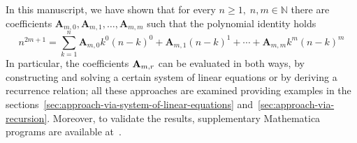 In this manuscript, we have shown that for every $n\geq 1, \; n,m\in\mathbb{N}$
there are coefficients $\mathbf{A}_{m,0}, \mathbf{A}_{m,1}, \ldots, \mathbf{A}_{m,m}$ such that
the polynomial identity holds
\[
    n^{2m+1} = \sum_{k=1}^{n} \mathbf{A}_{m,0} k^0 (n-k)^0 + \mathbf{A}_{m,1}(n-k)^1
    + \cdots + \mathbf{A}_{m,m} k^m (n-k)^m
\]
In particular, the coefficients ${\mathbf{A}} \sb{m,r}$ can be evaluated in both ways,
by constructing and solving a certain system of linear equations or by deriving a recurrence relation;
all these approaches are examined providing examples
in the sections~\ref{sec:approach-via-system-of-linear-equations} and~\ref{sec:approach-via-recursion}.
Moreover, to validate the results, supplementary Mathematica programs are available at~\cite{kolosov2023github}.
